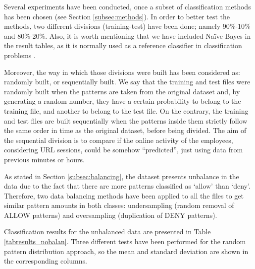 \documentclass{llncs}
\begin{document}
\noindent Several experiments have been conducted, once a subset of classification methods has been chosen (see Section \ref{subsec:methods}). In order to better test the methods, two different divisions (training-test) have been done; namely 90\%-10\% and 80\%-20\%. Also, it is worth mentioning that we have included Na\"ive Bayes in the result tables, as it is normally used as a reference classifier in classification problems \cite{Frank2011}.   

Moreover, the way in which those divisions were built has been considered as: randomly built, or sequentially built. We say that the training and test files were randomly built when the patterns are taken from the original dataset and, by generating a random number, they have a certain probability to belong to the training file, and another to belong to the test file. On the contrary, the training and test files are built sequentially when the patterns inside them strictly follow the same order in time as the original dataset, before being divided. The aim of the sequential division is to compare if the online activity of the employees, considering URL sessions, could be somehow ``predicted'', just using data from previous minutes or hours.

As stated in Section \ref{subsec:balancing}, the dataset presents unbalance in the data due to the fact that there are more patterns classified as `allow' than `deny'. Therefore, two data balancing methods have been applied to all the files to get similar pattern amounts in both classes: undersampling (random removal of ALLOW patterns) and oversampling (duplication of DENY patterns). 

Classification results for the unbalanced data are presented in Table \ref{tabresults_nobalan}. Three different tests have been performed for the random pattern distribution approach, so the mean and standard deviation are shown in the corresponding columns.
\end{document}
